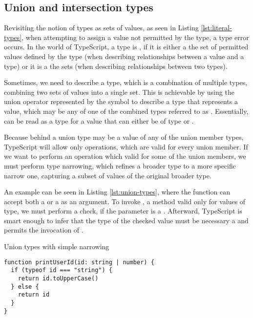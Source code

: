 \subsection{Union and intersection types}

Revisiting the notion of types as sets of values, as seen in Listing \ref{lst:literal-types}, when attempting to assign a value not permitted by the  type, a type error occurs. In the world of TypeScript, a type is , if it is either a  the set of permitted values defined by the type (when describing relationships between a value and a type) or it is a  the sets (when describing relationships between two types).

Sometimes, we need to describe a type, which is a combination of multiple types, combining two sets of values into a single set. This is achievable by using the union operator represented by the \code{|} symbol to describe a type that represents a value, which may be any of one of the combined types referred to as  \cite{DocumentationEverydayTypes}. Essentially,  can be read as a type for a value that can either be of type  or .

Because behind a union type may be a value of any of the union member types, TypeScript will allow only operations, which are valid for every union member. If we want to perform an operation which valid for some of the union members, we must perform type narrowing, which refines a broader type to a more specific narrow one, capturing a subset of values of the original broader type.

An example can be seen in Listing \ref{lst:union-types}, where the function  can accept both a  or a  as an argument. To invoke , a method valid only for values of  type, we must perform a check, if the parameter is a . Afterward, TypeScript is smart enough to infer that the type of the checked value must be necessary a  and permits the invocation of .

\begin{listing}[h]
  \caption{Union types with simple narrowing}\label{lst:union-types}
  \begin{verbatim}
function printUserId(id: string | number) {
  if (typeof id === "string") {
    return id.toUpperCase()
  } else {
    return id
  }
}
  \end{verbatim}
\end{listing}


